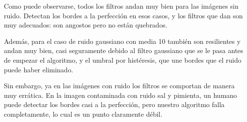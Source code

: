 \documentclass[11pt, spanish]{article}
\begin{document}
Como puede observarse, todos los filtros andan muy bien para las imágenes sin ruido. Detectan los bordes a la perfección en esos casos, y los filtros que dan son muy adecuados: son angostos pero no están quebrados.

Además, para el caso de ruido gaussiano con media 10 también son resilientes y andan muy bien, casi seguramente debido al filtro gaussiano que se le pasa antes de empezar el algoritmo, y el umbral por histéresis, que une bordes que el ruido puede haber eliminado.

Sin embargo, ya en las imágenes con ruido los filtros se comportan de manera muy errática.
En la imagen contaminada con ruido sal y pimienta, un humano puede detectar los bordes casi a la perfección, pero nuestro algoritmo falla completamente, lo cual es un punto claramente débil.
\end{document}
